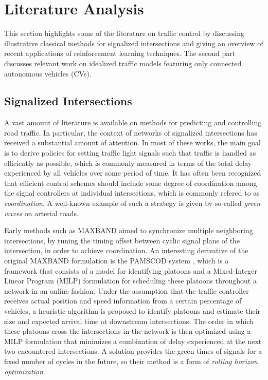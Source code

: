 \documentclass{article}
\begin{document}
\section{Literature Analysis} \label{sec:broadliterature}


This section highlights some of the literature on traffic control by discussing
illustrative classical methods for signalized intersections and giving an
overview of recent applications of reinforcement learning techniques. The second
part discusses relevant work on idealized traffic models featuring only
connected autonomous vehicles (CVs).

\subsection{Signalized Intersections}


A vast amount of literature is available on methods for predicting and
controlling road traffic. In particular, the context of networks of signalized
intersections has received a substantial amount of attention. In most of these
works, the main goal is to derive policies for setting traffic light signals
such that traffic is handled as efficiently as possible, which is commonly
measured in terms of the total delay experienced by all vehicles over some
period of time. It has often been recognized that efficient control schemes
should include some degree of coordination among the signal controllers at
individual intersections, which is commonly refered to as \textit{coordination}.
A well-known example of such a strategy is given by so-called \textit{green
  waves} on arterial roads.


Early methods such as MAXBAND \cite{mcshane_traffic_1990} aimed to synchronize
multiple neighboring intersections, by tuning the timing offset between cyclic
signal plans of the intersection, in order to achieve coordination. An
interesting derivative of the original MAXBAND formulation is the PAMSCOD system
\cite{he_pamscod_2012}, which is a framework that consists of a model for
identifying platoons and a Mixed-Integer Linear Program (MILP) formulation for
scheduling these platoons throughout a network in an online fashion. Under the
assumption that the traffic controller receives actual position and speed
information from a certain percentage of vehicles, a heuristic algorithm is
proposed to identify platoons and estimate their size and expected arrival time
at downstream intersections. The order in which these platoons cross the
intersections in the network is then optimized using a MILP formulation that
minimizes a combination of delay experienced at the next two encountered
intersections. A solution provides the green times of signals for a fixed number
of cycles in the future, so their method is a form of \textit{rolling horizon
  optimization}.
\end{document}
